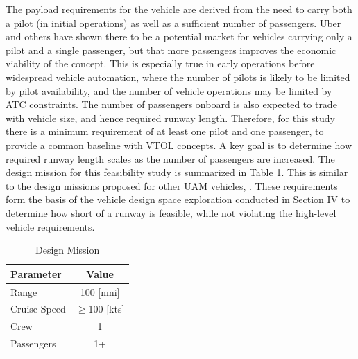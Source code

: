 \documentclass[]{aiaa-tc}%
\begin{document}
The payload requirements for the vehicle are derived from the need to carry both a pilot (in initial operations) as well as a sufficient number of passengers. Uber and others have shown there to be a potential market for vehicles carrying only a pilot and a single passenger, but that more passengers improves the economic viability of the concept\cite{Uber}.  This is especially true in early operations before widespread vehicle automation, where the number of pilots is likely to be limited by pilot availability, and the number of vehicle operations may be limited by ATC constraints.   The number of passengers onboard is also expected to trade with vehicle size, and hence required runway length.  Therefore, for this study there is a minimum requirement of at least one pilot and one passenger, to provide a common baseline with VTOL concepts.  A key goal is to determine how required runway length scales as the number of passengers are increased.  The design mission for this feasibility study is summarized in Table \ref{t:design_mission}.  This is similar to the design missions proposed for other UAM vehicles\cite{Uber}, \cite{Antcliff}.  These requirements form the basis of the vehicle design space exploration conducted in Section IV to determine how short of a runway is feasible, while not violating the high-level vehicle requirements. 


\begin{table}[H]
    \centering
    \caption{Design Mission}
    \label{t:design_mission}
    \begin{tabular}{l c}
    \toprule
    \toprule
    Parameter                                   & Value         \\ \hline
    Range                        & 100 [nmi]      \\
    Cruise Speed                      & $\ge$100 [kts]           \\
    Crew                         & 1  \\
    Passengers                & 1+ \\
    \bottomrule
\end{tabular}
\end{table}
\end{document}
